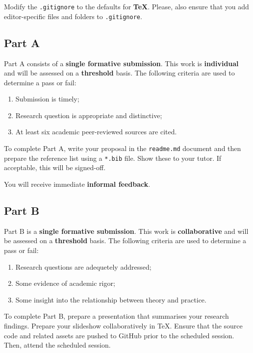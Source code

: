 \documentclass{../fal_assignment}
\begin{document}
Modify the \texttt{.gitignore} to the defaults for \textbf{TeX}. Please, also ensure that you add editor-specific files and folders to \texttt{.gitignore}. 

\subsection*{Part A}

Part A consists of a \textbf{single formative submission}. This work is \textbf{individual} and will be assessed on a \textbf{threshold} basis. The following criteria are used to determine a pass or fail:

\begin{enumerate}[label=(\alph*)]
	\item Submission is timely;
	\item Research question is appropriate and distinctive;
	\item At least six academic peer-reviewed sources are cited.
\end{enumerate}

To complete Part A, write your proposal in the \texttt{readme.md} document and then prepare the reference list using a \texttt{*.bib} file.  Show these to your tutor.  If acceptable, this will be signed-off. 

You will receive immediate \textbf{informal feedback}.

\subsection*{Part B}

Part B is a \textbf{single formative submission}. This work is \textbf{collaborative} and will be assessed on a \textbf{threshold} basis. The following criteria are used to determine a pass or fail:

\begin{enumerate}[label=(\alph*)]
	\item Research questions are adequetely addressed;
	\item Some evidence of academic rigor;
	\item Some insight into the relationship between theory and practice.
\end{enumerate}

To complete Part B, prepare a presentation that summarises your research findings. Prepare your slideshow collaboratively in TeX. Ensure that the source code and related assets are pushed to GitHub prior to the scheduled session. Then, attend the scheduled session.
\end{document}
